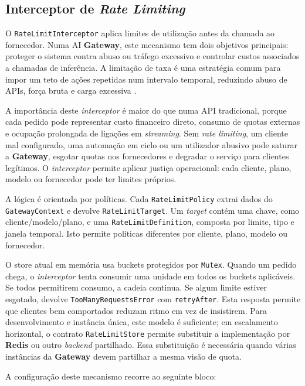     \subsection{Interceptor de \textit{Rate Limiting} }
    O \texttt{RateLimitInterceptor} aplica limites de utilização antes da chamada ao fornecedor. Numa AI \textbf{Gateway}, este mecanismo tem dois objetivos principais: proteger o sistema contra abuso ou tráfego excessivo e controlar custos associados a chamadas de inferência. A limitação de taxa é uma estratégia comum para impor um teto de ações repetidas num intervalo temporal, reduzindo abuso de APIs, força bruta e carga excessiva \cite{cloudflare_rate_limiting}.

    A importância deste \textit{interceptor} é maior do que numa API tradicional, porque cada pedido pode representar custo financeiro direto, consumo de quotas externas e ocupação prolongada de ligações em \textit{streaming}. Sem \textit{rate limiting}, um cliente mal configurado, uma automação em ciclo ou um utilizador abusivo pode saturar a \textbf{Gateway}, esgotar quotas nos fornecedores e degradar o serviço para clientes legítimos. O \textit{interceptor} permite aplicar justiça operacional: cada cliente, plano, modelo ou fornecedor pode ter limites próprios.

    A lógica é orientada por políticas. Cada \texttt{RateLimitPolicy} extrai dados do \texttt{GatewayContext} e devolve \texttt{RateLimitTarget}. Um \textit{target} contém uma chave, como cliente/modelo/plano, e uma \texttt{RateLimitDefinition}, composta por limite, tipo e janela temporal. Isto permite políticas diferentes por cliente, plano, modelo ou fornecedor.

    O store atual em memória usa buckets protegidos por \texttt{Mutex}. Quando um pedido chega, o \textit{interceptor} tenta consumir uma unidade em todos os buckets aplicáveis. Se todos permitirem consumo, a cadeia continua. Se algum limite estiver esgotado, devolve \texttt{TooManyRequestsError} com \texttt{retryAfter}. Esta resposta permite que clientes bem comportados reduzam ritmo em vez de insistirem. Para desenvolvimento e instância única, este modelo é suficiente; em escalamento horizontal, o contrato \texttt{RateLimitStore} permite substituir a implementação por \textbf{Redis} ou outro \textit{backend} partilhado. Essa substituição é necessária quando várias instâncias da \textbf{Gateway} devem partilhar a mesma visão de quota.

    A configuração deste mecanismo recorre ao seguinte bloco:

